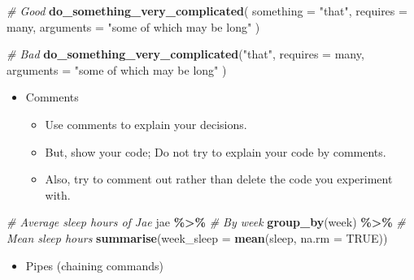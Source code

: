 \documentclass[
]{book}
\newenvironment{Shaded}{\begin{snugshade}}{\end{snugshade}}
\newcommand{\AttributeTok}[1]{\textcolor[rgb]{0.13,0.29,0.53}{#1}}
\newcommand{\CommentTok}[1]{\textcolor[rgb]{0.56,0.35,0.01}{\textit{#1}}}
\newcommand{\ConstantTok}[1]{\textcolor[rgb]{0.56,0.35,0.01}{#1}}
\newcommand{\FunctionTok}[1]{\textcolor[rgb]{0.13,0.29,0.53}{\textbf{#1}}}
\newcommand{\NormalTok}[1]{#1}
\newcommand{\SpecialCharTok}[1]{\textcolor[rgb]{0.81,0.36,0.00}{\textbf{#1}}}
\newcommand{\StringTok}[1]{\textcolor[rgb]{0.31,0.60,0.02}{#1}}
\providecommand{\tightlist}{%
  \setlength{\itemsep}{0pt}\setlength{\parskip}{0pt}}
\begin{document}
\begin{Shaded}
\begin{Highlighting}[]
\CommentTok{\# Good}
\FunctionTok{do\_something\_very\_complicated}\NormalTok{(}
  \AttributeTok{something =} \StringTok{"that"}\NormalTok{,}
  \AttributeTok{requires =}\NormalTok{ many,}
  \AttributeTok{arguments =} \StringTok{"some of which may be long"}
\NormalTok{)}

\CommentTok{\# Bad}
\FunctionTok{do\_something\_very\_complicated}\NormalTok{(}\StringTok{"that"}\NormalTok{, }\AttributeTok{requires =}\NormalTok{ many, }\AttributeTok{arguments =}
                              \StringTok{"some of which may be long"}
\NormalTok{                              )}
\end{Highlighting}
\end{Shaded}

\begin{itemize}
\tightlist
\item
  Comments

  \begin{itemize}
  \tightlist
  \item
    Use comments to explain your decisions.
  \item
    But, show your code; Do not try to explain your code by comments.
  \item
    Also, try to comment out rather than delete the code you experiment with.
  \end{itemize}
\end{itemize}

\begin{Shaded}
\begin{Highlighting}[]
\CommentTok{\# Average sleep hours of Jae}
\NormalTok{jae }\SpecialCharTok{\%\textgreater{}\%}
  \CommentTok{\# By week}
  \FunctionTok{group\_by}\NormalTok{(week) }\SpecialCharTok{\%\textgreater{}\%}
  \CommentTok{\# Mean sleep hours}
  \FunctionTok{summarise}\NormalTok{(}\AttributeTok{week\_sleep =} \FunctionTok{mean}\NormalTok{(sleep, }\AttributeTok{na.rm =} \ConstantTok{TRUE}\NormalTok{))}
\end{Highlighting}
\end{Shaded}

\begin{itemize}
\tightlist
\item
  Pipes (chaining commands)
\end{itemize}
\end{document}

